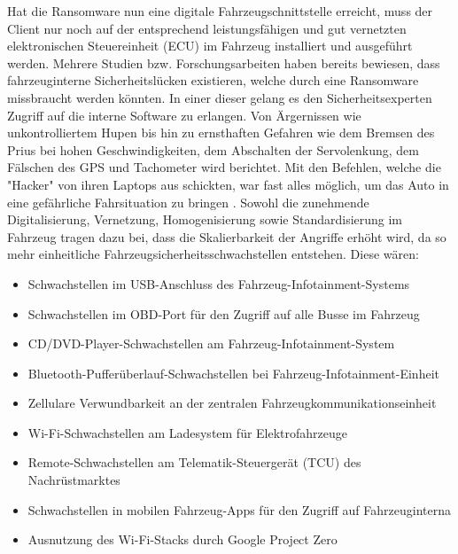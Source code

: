 Hat die Ransomware nun eine digitale Fahrzeugschnittstelle erreicht, muss der 
Client nur noch auf der entsprechend leistungsfähigen und gut vernetzten elektronischen 
Steuereinheit (ECU) im Fahrzeug installiert und ausgeführt werden.
\newline 
Mehrere Studien bzw. Forschungsarbeiten haben bereits bewiesen, dass fahrzeuginterne 
Sicherheitslücken existieren, welche durch eine Ransomware missbraucht werden könnten. 
In einer dieser gelang es den Sicherheitsexperten Zugriff auf die interne Software zu 
erlangen. Von Ärgernissen wie unkontrolliertem Hupen bis hin zu ernsthaften Gefahren 
wie dem Bremsen des Prius bei hohen Geschwindigkeiten, dem Abschalten der Servolenkung, 
dem Fälschen des GPS und Tachometer wird berichtet. Mit den Befehlen, welche die "Hacker" von ihren Laptops aus 
schickten, war fast alles möglich, um das Auto in eine gefährliche Fahrsituation zu 
bringen \cite[vgl.]{Greenberg.24.07.2013}.
\newline
Sowohl die zunehmende Digitalisierung, Vernetzung, Homogenisierung sowie Standardisierung 
im Fahrzeug tragen dazu bei, dass die Skalierbarkeit 
der Angriffe erhöht wird, da so mehr einheitliche Fahrzeugsicherheitsschwachstellen 
entstehen. Diese wären:

\begin{itemize}
    \item Schwachstellen im USB-Anschluss des Fahrzeug-Infotainment-Systems
    \item Schwachstellen im OBD-Port für den Zugriff auf alle Busse im Fahrzeug
    \item CD/DVD-Player-Schwachstellen am Fahrzeug-Infotainment-System
    \item Bluetooth-Pufferüberlauf-Schwachstellen bei Fahrzeug-Infotainment-Einheit
    \item Zellulare Verwundbarkeit an der zentralen Fahrzeugkommunikationseinheit
    \item Wi-Fi-Schwachstellen am Ladesystem für Elektrofahrzeuge
    \item Remote-Schwachstellen am Telematik-Steuergerät (TCU) des Nachrüstmarktes
    \item Schwachstellen in mobilen Fahrzeug-Apps für den Zugriff auf Fahrzeuginterna
    \item Ausnutzung des Wi-Fi-Stacks durch Google Project Zero
\end{itemize}
	
